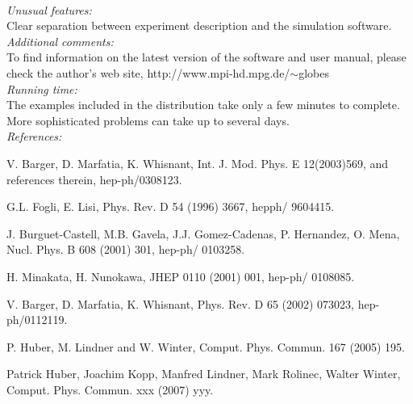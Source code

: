 \documentclass{elsart}
\newcounter{bla}
\newenvironment{refnummer}{%
\list{[\arabic{bla}]}%
{\usecounter{bla}%
 \setlength{\itemindent}{0pt}%
 \setlength{\topsep}{0pt}%
 \setlength{\itemsep}{0pt}%
 \setlength{\labelsep}{2pt}%
 \setlength{\listparindent}{0pt}%
 \settowidth{\labelwidth}{[9]}%
 \setlength{\leftmargin}{\labelwidth}%
 \addtolength{\leftmargin}{\labelsep}%
 \setlength{\rightmargin}{0pt}}}
 {\endlist}
\begin{document}
\begin{small}
   \\
{\em Unusual features:}\\
   Clear separation between experiment description and the simulation software.
   \\
{\em Additional comments:}\\
   To find information on the latest version of the software and user manual, please check the author's
  web site,  http://www.mpi-hd.mpg.de/$\sim$globes
   \\
{\em Running time:}\\
The examples included in the distribution take only a few minutes to
complete. More sophisticated problems can take up to several days.
   \\
{\em References:}
\begin{refnummer}
\item V. Barger, D. Marfatia, K. Whisnant, Int. J. Mod. Phys. E 12(2003)569, and references therein,
hep-ph/0308123.
\item G.L. Fogli, E. Lisi, Phys. Rev. D 54 (1996) 3667, hepph/
9604415.
\item J. Burguet-Castell, M.B. Gavela, J.J. Gomez-Cadenas, P. Hernandez,
O. Mena, Nucl. Phys. B 608 (2001) 301, hep-ph/ 0103258.
\item H. Minakata, H. Nunokawa, JHEP 0110 (2001) 001, hep-ph/
0108085.
\item V. Barger, D. Marfatia, K. Whisnant, Phys. Rev. D 65 (2002)
073023, hep-ph/0112119.
\item P. Huber, M. Lindner and W. Winter, Comput. Phys. Commun. 167 (2005) 195.
\item Patrick Huber, Joachim Kopp, Manfred Lindner, Mark Rolinec, Walter Winter, Comput. Phys. Commun. xxx (2007) yyy.
\end{refnummer}

\end{small}

\newpage
\end{document}
